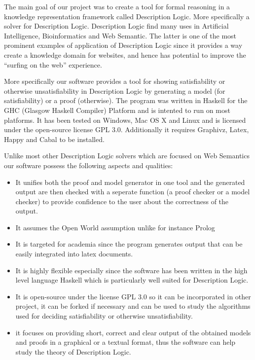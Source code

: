 
The main goal of our project was to create a tool for formal reasoning
in a knowledge representation framework called Description Logic. More
specifically a solver for Description Logic. Description Logic find
many uses in Artificial Intelligence, Bioinformatics and Web
Semantic. The latter is one of the most prominent examples of
application of Description Logic since it provides a way create a
knowledge domain for websites, and hence has potential to improve the
``surfing on the web'' experience.

More specifically our software provides a tool for showing
satisfiability or otherwise unsatisfiability in Description Logic by
generating a model (for satisfiability) or a proof (otherwise). The
program was written in Haskell for the GHC (Glasgow Haskell Compiler)
Platform and is intented to run on most platforms. It has been tested
on Windows, Mac OS X and Linux and is licensed under the open-source
license GPL 3.0. Additionally it requires Graphivz, Latex, Happy and
Cabal to be installed. 

Unlike most other Description Logic solvers which are focused on Web
Semantics our software possess the following aspects and qualities: 

\begin{itemize}
\item It unifies both the proof and model generator in one tool and
  the generated output are then checked with a seperate function (a
  proof checker or a model checker) to provide confidence to the
  user about the correctness of the output.
\item It assumes the Open World assumption unlike for instance Prolog
\item It is targeted for academia since the program generates output
  that can be easily integrated into latex documents.
\item It is highly flexible especially since the software has been
  written in the high level language Haskell which is particularly
  well suited for Description Logic.
\item It is open-source under the license GPL 3.0 so it can be
  incorporated in other project, it can be forked if necessary and can
  be used to study the algorithms used for deciding satisfiability or
  otherwise unsatisfiability.
\item it focuses on providing short, correct and clear output of the
  obtained models and proofs in a graphical or a textual format, thus
  the software can help study the theory of Description Logic.
\end{itemize}

